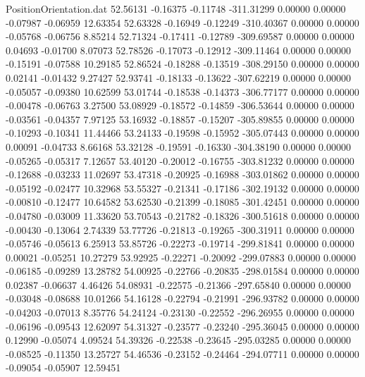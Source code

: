 \begin{filecontents}{PositionOrientation.dat}
  52.56131   -0.16375   -0.11748  -311.31299    0.00000    0.00000   -0.07987   -0.06959   12.63354
  52.63328   -0.16949   -0.12249  -310.40367    0.00000    0.00000   -0.05768   -0.06756    8.85214
  52.71324   -0.17411   -0.12789  -309.69587    0.00000    0.00000    0.04693   -0.01700    8.07073
  52.78526   -0.17073   -0.12912  -309.11464    0.00000    0.00000   -0.15191   -0.07588   10.29185
  52.86524   -0.18288   -0.13519  -308.29150    0.00000    0.00000    0.02141   -0.01432    9.27427
  52.93741   -0.18133   -0.13622  -307.62219    0.00000    0.00000   -0.05057   -0.09380   10.62599
  53.01744   -0.18538   -0.14373  -306.77177    0.00000    0.00000   -0.00478   -0.06763    3.27500
  53.08929   -0.18572   -0.14859  -306.53644    0.00000    0.00000   -0.03561   -0.04357    7.97125
  53.16932   -0.18857   -0.15207  -305.89855    0.00000    0.00000   -0.10293   -0.10341   11.44466
  53.24133   -0.19598   -0.15952  -305.07443    0.00000    0.00000    0.00091   -0.04733    8.66168
  53.32128   -0.19591   -0.16330  -304.38190    0.00000    0.00000   -0.05265   -0.05317    7.12657
  53.40120   -0.20012   -0.16755  -303.81232    0.00000    0.00000   -0.12688   -0.03233   11.02697
  53.47318   -0.20925   -0.16988  -303.01862    0.00000    0.00000   -0.05192   -0.02477   10.32968
  53.55327   -0.21341   -0.17186  -302.19132    0.00000    0.00000   -0.00810   -0.12477   10.64582
  53.62530   -0.21399   -0.18085  -301.42451    0.00000    0.00000   -0.04780   -0.03009   11.33620
  53.70543   -0.21782   -0.18326  -300.51618    0.00000    0.00000   -0.00430   -0.13064    2.74339
  53.77726   -0.21813   -0.19265  -300.31911    0.00000    0.00000   -0.05746   -0.05613    6.25913
  53.85726   -0.22273   -0.19714  -299.81841    0.00000    0.00000    0.00021   -0.05251   10.27279
  53.92925   -0.22271   -0.20092  -299.07883    0.00000    0.00000   -0.06185   -0.09289   13.28782
  54.00925   -0.22766   -0.20835  -298.01584    0.00000    0.00000    0.02387   -0.06637    4.46426
  54.08931   -0.22575   -0.21366  -297.65840    0.00000    0.00000   -0.03048   -0.08688   10.01266
  54.16128   -0.22794   -0.21991  -296.93782    0.00000    0.00000   -0.04203   -0.07013    8.35776
  54.24124   -0.23130   -0.22552  -296.26955    0.00000    0.00000   -0.06196   -0.09543   12.62097
  54.31327   -0.23577   -0.23240  -295.36045    0.00000    0.00000    0.12990   -0.05074    4.09524
  54.39326   -0.22538   -0.23645  -295.03285    0.00000    0.00000   -0.08525   -0.11350   13.25727
  54.46536   -0.23152   -0.24464  -294.07711    0.00000    0.00000   -0.09054   -0.05907   12.59451

\end{filecontents}
